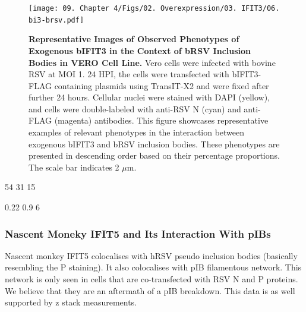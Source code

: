 \begin{figure}
    \centering
    \texttt{[image: 09. Chapter 4/Figs/02. Overexpression/03. IFIT3/06. bi3-brsv.pdf]}
    \caption[Representative Images of Observed Phenotypes of Exogenous bIFIT3 in the Context of bRSV Inclusion Bodies in VERO Cell Line.]{\textbf{Representative Images of Observed Phenotypes of Exogenous bIFIT3 in the Context of bRSV Inclusion Bodies in VERO Cell Line.} Vero cells were infected with bovine RSV at MOI 1. 24 HPI, the cells were transfected with bIFIT3-FLAG containing plasmids using TransIT-X2 and were fixed after further 24 hours. Cellular nuclei were stained with DAPI (yellow), and cells were double-labeled with anti-RSV N (cyan) and anti-FLAG (magenta) antibodies. This figure showcases representative examples of relevant phenotypes in the interaction between exogenous bIFIT3 and bRSV inclusion bodies. These phenotypes are presented in descending order based on their percentage proportions. The scale bar indicates 2 \(\mu \mbox{m}\).}
    \label{fig:Representative Images of Observed Phenotypes of Exogenous bIFIT3 in the Context of bRSV Inclusion Bodies in VERO Cell Line}
\end{figure}

54 31 15

0.22 0.9 6

\subsubsection{Nascent Moneky IFIT5 and Its Interaction With pIBs}
Nascent monkey IFIT5 colocalises with hRSV pseudo inclusion bodies (basically resembling the P staining). It also colocalises with pIB filamentous network. This network is only seen in cells that are co-transfected with RSV N and P proteins. We believe that they are an aftermath of a pIB breakdown. This data is as well supported by z stack measurements.

